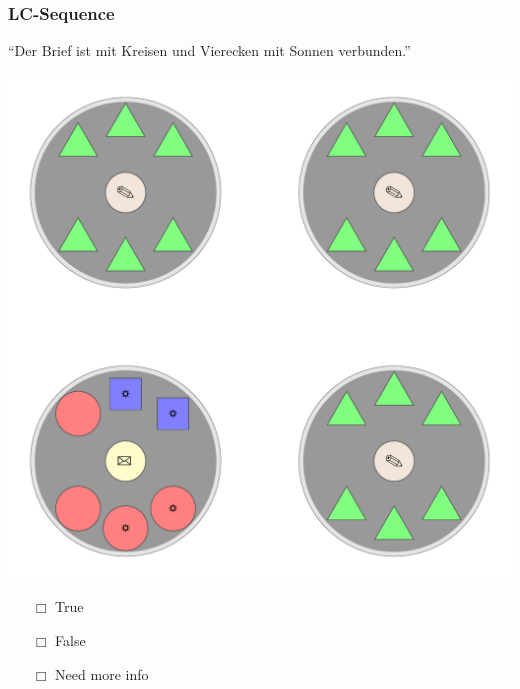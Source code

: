 \documentclass[fleqn,10pt,xcolor=dvipsnames]{beamer}
\newcommand{\LC}{LC\xspace}
\newcommand{\mymark}[1]{{\color{mycol}{#1}}}
\begin{document}
\begin{frame}
  \frametitle{\LC-Sequence}
  \begin{center}
    ``Der Brief ist mit Kreisen und Vierecken mit Sonnen verbunden.''

    \vspace{0.1cm}

    \includegraphics[width=0.5 \textwidth]{../../pictures/lc_01_1.pdf}

    \vspace{0.1cm}

    \begin{multicols}{3}
      \begin{itemize} 
      \item[$\Box$] True\\
        \onslide<2>{$\leadsto$  \mymark{false}}
      \item[$\Box$] False\\
        \onslide<2>{$\leadsto$ \mymark{false}}
      \item[$\Box$] Need more info 
      \end{itemize}
    \end{multicols}

  \end{center}
\end{frame}
\end{document}
